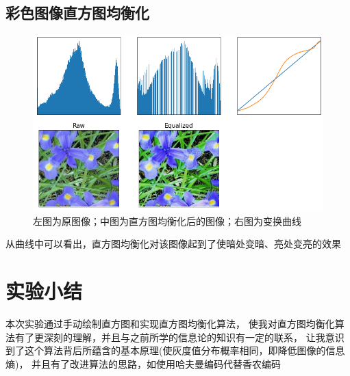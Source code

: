 \documentclass[a4paper]{ctexart}
\begin{document}
  \subsection*{彩色图像直方图均衡化}
  \begin{figure}[H]
    \centering \includegraphics*[width=1.0\textwidth]{fig/equacolor.png}
    \caption{左图为原图像；中图为直方图均衡化后的图像；右图为变换曲线}
  \end{figure}
  从曲线中可以看出，直方图均衡化对该图像起到了使暗处变暗、亮处变亮的效果

  \section{实验小结}
  本次实验通过手动绘制直方图和实现直方图均衡化算法，
  使我对直方图均衡化算法有了更深刻的理解，并且与之前所学的信息论的知识有一定的联系，
  让我意识到了这个算法背后所蕴含的基本原理(使灰度值分布概率相同，即降低图像的信息熵)，
  并且有了改进算法的思路，如使用哈夫曼编码代替香农编码
\end{document}
